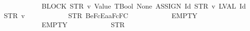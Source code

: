 \begin{isabellebody}
\ \ \ \ \ \ \ \ \ \ \ \ {\isacharparenleft}{\kern0pt}BLOCK\ {\isacharparenleft}{\kern0pt}{\isacharparenleft}{\kern0pt}STR\ {\isacharprime}{\kern0pt}{\isacharprime}{\kern0pt}v{}{\isacharprime}{\kern0pt}{\isacharprime}{\kern0pt}{\isacharcomma}{\kern0pt}\ Value\ TBool{\isacharparenright}{\kern0pt}{\isacharcomma}{\kern0pt}\ None{\isacharparenright}{\kern0pt}\ {\isacharparenleft}{\kern0pt}ASSIGN\ {\isacharparenleft}{\kern0pt}Id\ {\isacharparenleft}{\kern0pt}STR\ {\isacharprime}{\kern0pt}{\isacharprime}{\kern0pt}v{}{\isacharprime}{\kern0pt}{\isacharprime}{\kern0pt}{\isacharparenright}{\kern0pt}{\isacharparenright}{\kern0pt}\ {\isacharparenleft}{\kern0pt}LVAL\ {\isacharparenleft}{\kern0pt}Id\ {\isacharparenleft}{\kern0pt}STR\ {\isacharprime}{\kern0pt}{\isacharprime}{\kern0pt}v{}{\isacharprime}{\kern0pt}{\isacharprime}{\kern0pt}{\isacharparenright}{\kern0pt}{\isacharparenright}{\kern0pt}{\isacharparenright}{\kern0pt}{\isacharparenright}{\kern0pt}{\isacharparenright}{\kern0pt}\isanewline
\ \ \ \ \ \ \ \ \ \ \ \ {\isacharparenleft}{\kern0pt}STR\ {\isacharprime}{\kern0pt}{\isacharprime}{\kern0pt}{}{}{}Be{}{}{}{}FcEa{}{}aF{}{}{}{}{}{}{}{}{}c{}{}F{}{}{}{}{}{}C{}{}{}{\isacharprime}{\kern0pt}{\isacharprime}{\kern0pt}{\isacharparenright}{\kern0pt}\isanewline
\ \ \ \ \ \ \ \ \ \ \ \ EMPTY\isanewline
\ \ \ \ \ \ \ \ \ \ \ \ EMPTY\isanewline
\ \ \ \ \ \ \ \ \ \ \ \ {\isacharparenleft}{\kern0pt}STR\ {\isacharprime}{\kern0pt}{\isacharprime}{\kern0pt}{}{\isacharprime}{\kern0pt}{\isacharprime}{\kern0pt}{\isacharparenright}{\kern0pt}\isanewline

\end{isabellebody}
